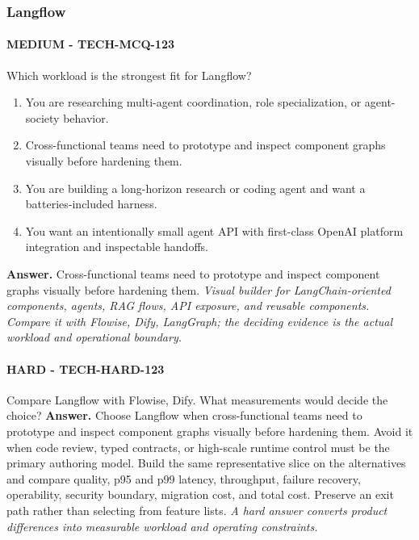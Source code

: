 \subsubsection*{Langflow}
\paragraph{MEDIUM - TECH-MCQ-123} Which workload is the strongest fit for Langflow?
\begin{enumerate}[label=\Alph*.]
\item You are researching multi-agent coordination, role specialization, or agent-society behavior.
\item Cross-functional teams need to prototype and inspect component graphs visually before hardening them.
\item You are building a long-horizon research or coding agent and want a batteries-included harness.
\item You want an intentionally small agent API with first-class OpenAI platform integration and inspectable handoffs.
\end{enumerate}
\textbf{Answer.} Cross-functional teams need to prototype and inspect component graphs visually before hardening them.
\textit{Visual builder for LangChain-oriented components, agents, RAG flows, API exposure, and reusable components. Compare it with Flowise, Dify, LangGraph; the deciding evidence is the actual workload and operational boundary.}
\paragraph{HARD - TECH-HARD-123} Compare Langflow with Flowise, Dify. What measurements would decide the choice?
\textbf{Answer.} Choose Langflow when cross-functional teams need to prototype and inspect component graphs visually before hardening them. Avoid it when code review, typed contracts, or high-scale runtime control must be the primary authoring model. Build the same representative slice on the alternatives and compare quality, p95 and p99 latency, throughput, failure recovery, operability, security boundary, migration cost, and total cost. Preserve an exit path rather than selecting from feature lists.
\textit{A hard answer converts product differences into measurable workload and operating constraints.}

